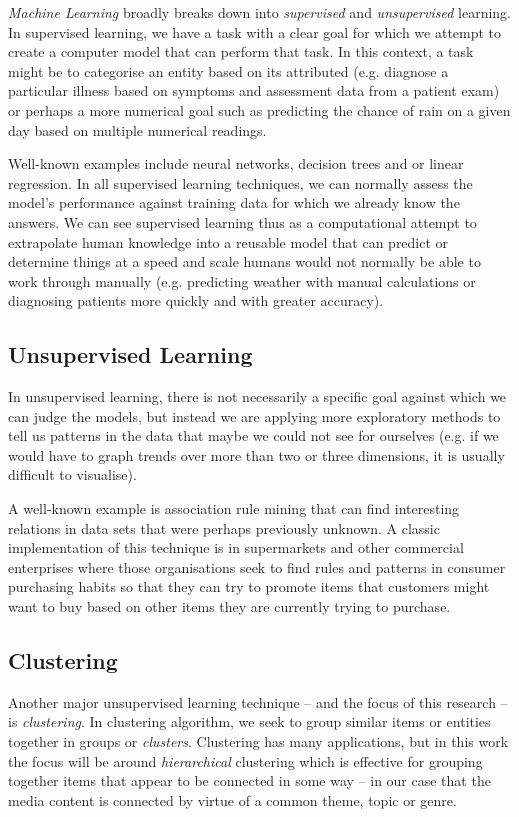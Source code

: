 \emph{Machine Learning} broadly breaks down into \emph{supervised}
and \emph{unsupervised} learning. In supervised learning, we have
a task with a clear goal for which we attempt to create a computer
model that can perform that task. In this context, a task might be
to categorise an entity based on its attributed (e.g. diagnose
a particular illness based on symptoms and assessment data from a
patient exam) or perhaps a more numerical goal such as predicting
the chance of rain on a given day based on multiple numerical
readings.

Well-known examples include neural networks, decision trees and or
linear regression. In all supervised learning techniques, we can
normally assess the model's performance against training data for
which we already know the answers. We can see supervised learning
thus as a computational attempt to extrapolate human knowledge into
a reusable model that can predict or determine things at a speed
and scale humans would not normally be able to work through manually
(e.g. predicting weather with manual calculations or diagnosing
patients more quickly and with greater accuracy).

\subsection{Unsupervised Learning}

In unsupervised learning, there is not necessarily a specific goal
against which we can judge the models, but instead we are applying
more exploratory methods to tell us patterns in the data that maybe
we could not see for ourselves (e.g. if we would have to graph trends
over more than two or three dimensions, it is usually difficult to
visualise).

A well-known example is association rule mining that can find
interesting relations in data sets that were perhaps previously
unknown. A classic implementation of this technique is in
supermarkets and other commercial enterprises where those
organisations seek to find rules and patterns in consumer purchasing
habits so that they can try to promote items that customers might
want to buy based on other items they are currently trying to
purchase.

\subsection{Clustering}

Another major unsupervised learning technique -- and the focus of
this research -- is \emph{clustering}. In clustering algorithm, we
seek to group similar items or entities together in groups or
\emph{clusters}. Clustering has many applications, but in this
work the focus will be around \emph{hierarchical} clustering which
is effective for grouping together items that appear to be
connected in some way -- in our case that the media content is
connected by virtue of a common theme, topic or genre.

